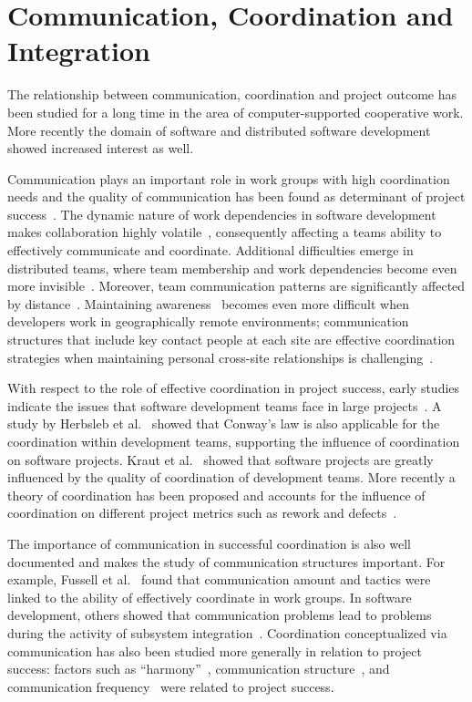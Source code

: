 \documentclass[12pt,oneside]{book}
\begin{document}
\section{Communication, Coordination and Integration}
\label{sec:RelatedCommunication}

The relationship between communication, coordination and project outcome has been
studied for a long time in the area of computer-supported cooperative work. More
recently the domain of software and distributed software development showed
increased interest as well.

Communication plays an important role in work groups with high coordination needs
and the quality of communication has been found as determinant of project
success~\cite{curtis:acm:1988,kraut:1995coordination}. The dynamic nature
of work dependencies in software development makes collaboration highly
volatile~\cite{Cataldo:2007hb}, consequently affecting a teams ability to
effectively communicate and coordinate. Additional difficulties emerge in
distributed teams, where team membership and work dependencies become even more
invisible~\cite{damian:icgse:2007}. Moreover, team communication patterns are
significantly affected by distance~\cite{hinds:cscw:2006}. Maintaining
awareness~\cite{sarma:2006icgse} becomes even more difficult when developers work
in geographically remote environments; communication structures that include key
contact people at each site are effective coordination strategies when
maintaining personal cross-site relationships is challenging~\cite{hinds:cscw:2006}.

With respect to the role of effective coordination in project success, early
studies indicate the issues that software development teams face in large
projects~\cite{curtis:acm:1988}. A study by Herbsleb et
al.~\cite{Herbsleb:1999ew} showed that Conway's law is also applicable for the
coordination within development teams, supporting the influence of coordination
on software projects. Kraut et al.~\cite{kraut:1995coordination} showed that
software projects are greatly influenced by the quality of coordination of
development teams. More recently a theory of coordination has been proposed and
accounts for the influence of coordination on different project metrics such as
rework and defects~\cite{Herbsleb:2006vn}.


The importance of communication in successful coordination is also well
documented and makes the study of communication structures important. For
example, Fussell et al.~\cite{fussell:cscw:1998} found that communication amount and
tactics were linked to the ability of effectively coordinate in work groups. In
software development, others showed that communication problems lead to problems
during the activity of subsystem
integration~\cite{Grinter:1999geography,deSouza2004:thwarts_collaboration}. Coordination
conceptualized via communication has also been studied more generally in relation
to project success: factors such as ``harmony''~\cite{Souder:1988jpim},
communication structure~\cite{Robin:1990jpim}, and communication
frequency~\cite{Griffin:1992ms} were related to project success.
\end{document}
